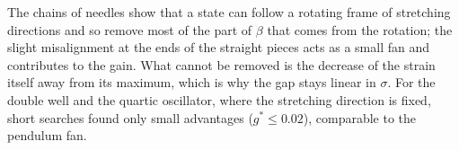 The chains of needles show that a state can follow a rotating frame of stretching directions and so remove most of the part of $\beta$ that comes from the rotation; the slight misalignment at the ends of the straight pieces acts as a small fan and contributes to the gain. What cannot be removed is the decrease of the strain itself away from its maximum, which is why the gap stays linear in $\sigma$. For the double well and the quartic oscillator, where the stretching direction is fixed, short searches found only small advantages ($g^* \leq 0.02$), comparable to the pendulum fan.

